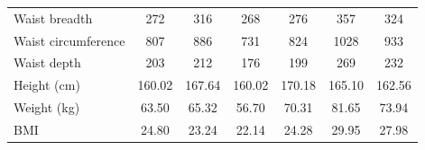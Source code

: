\documentclass[12pt,a4paper,openany,UKenglish]{scrreprt}
\begin{document}
\begin{table}[H]
\begin{tabular}{lcccccc}
		Waist breadth                & 272                                  & 316        & 268        & 276        & 357        & 324        \\
		Waist circumference          & 807                                  & 886        & 731        & 824        & 1028       & 933        \\
		Waist depth                  & 203                                  & 212        & 176        & 199        & 269        & 232        \\
		\hline
		Height (cm)                  & 160.02                               & 167.64     & 160.02     & 170.18     & 165.10     & 162.56     \\
		Weight (kg)                  & 63.50                                & 65.32      & 56.70      & 70.31      & 81.65      & 73.94      \\
		BMI                          & 24.80                                & 23.24      & 22.14      & 24.28      & 29.95      & 27.98
	\end{tabular}
\end{table}
\end{document}
